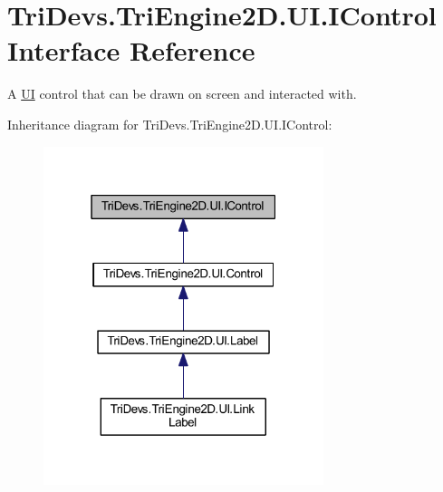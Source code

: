 \hypertarget{interface_tri_devs_1_1_tri_engine2_d_1_1_u_i_1_1_i_control}{\section{Tri\-Devs.\-Tri\-Engine2\-D.\-U\-I.\-I\-Control Interface Reference}
\label{interface_tri_devs_1_1_tri_engine2_d_1_1_u_i_1_1_i_control}
}


A \hyperlink{namespace_tri_devs_1_1_tri_engine2_d_1_1_u_i}{U\-I} control that can be drawn on screen and interacted with.  




Inheritance diagram for Tri\-Devs.\-Tri\-Engine2\-D.\-U\-I.\-I\-Control\-:\nopagebreak
\begin{figure}[H]
\begin{center}
\leavevmode
\includegraphics[width=232pt]{interface_tri_devs_1_1_tri_engine2_d_1_1_u_i_1_1_i_control__inherit__graph}
\end{center}
\end{figure}
